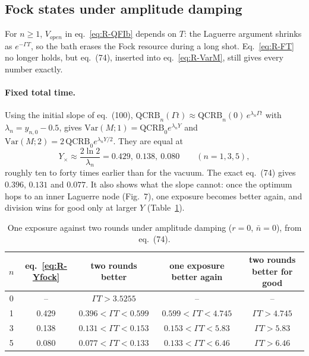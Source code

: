 \subsection{Fock states under amplitude damping}
\label{sec:rep-fock-cooling}

For $n \ge 1$, $V_{open}$ in eq.~\eqref{eq:R-QFIb} depends on $T$: the Laguerre argument shrinks as $e^{-\Gamma T}$, so the bath erases the Fock resource during a long shot. Eq.~\eqref{eq:R-FT} no longer holds, but eq.~(74), inserted into eq.~\eqref{eq:R-VarM}, still gives every number exactly.

\paragraph{Fixed total time.} Using the initial slope of eq.~(100), $\mathrm{QCRB}_n(\Gamma t) \approx \mathrm{QCRB}_n(0)\,e^{\lambda_n\Gamma t}$ with $\lambda_n = y_{n,0} - 0.5$, gives $\mathrm{Var}(M;1) = \mathrm{QCRB}_0e^{\lambda_nY}$ and $\mathrm{Var}(M;2) = 2\,\mathrm{QCRB}_0e^{\lambda_nY/2}$. They are equal at
\begin{equation}
\label{eq:R-Yfock}
    Y_\times \approx \frac{2\ln 2}{\lambda_n} = 0.429,\ 0.138,\ 0.080 \qquad (n = 1, 3, 5),
\end{equation}
roughly ten to forty times earlier than for the vacuum. The exact eq.~(74) gives $0.396$, $0.131$ and $0.077$. It also shows what the slope cannot: once the optimum hops to an inner Laguerre node (Fig.~7), one exposure becomes better again, and division wins for good only at larger $Y$ (Table~\ref{tab:R-fock-cool}).

\begin{table}[h]
\centering
\begin{tabular}{c c c c c}
\hline
$n$ & eq.~\eqref{eq:R-Yfock} & two rounds better & one exposure better again & two rounds better for good \\
\hline
0 & -- & $\Gamma T > 3.5255$ & -- & -- \\
1 & 0.429 & $0.396 < \Gamma T < 0.599$ & $0.599 < \Gamma T < 4.745$ & $\Gamma T > 4.745$ \\
3 & 0.138 & $0.131 < \Gamma T < 0.153$ & $0.153 < \Gamma T < 5.83$ & $\Gamma T > 5.83$ \\
5 & 0.080 & $0.077 < \Gamma T < 0.133$ & $0.133 < \Gamma T < 6.46$ & $\Gamma T > 6.46$ \\
\hline
\end{tabular}
\caption{One exposure against two rounds under amplitude damping ($r = 0$, $\bar{n} = 0$), from eq.~(74).}
\label{tab:R-fock-cool}
\end{table}

